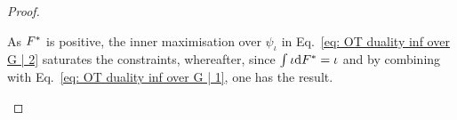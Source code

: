 \begin{proof}
\begin{enumerate}
As $F^*$ is positive, the inner maximisation over $\psi_\iota$  in Eq.~\eqref{eq: OT duality inf over G | 2} saturates the constraints, whereafter, since $\int\iota\mathrm{d}F^*=\iota$ and by combining with Eq.~\eqref{eq: OT duality inf over G | 1}, one has the result. \qedhere

\end{enumerate}

\end{proof}